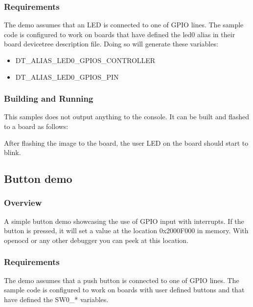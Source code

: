 \documentclass[letterpaper,10pt,english]{sphinxmanual}
\begin{document}
\subsubsection{Requirements}
\label{\detokenize{samples/basic/blinky/README:requirements}}
The demo assumes that an LED is connected to one of GPIO lines. The
sample code is configured to work on boards that have defined the led0
alias in their board devicetree description file. Doing so will generate
these variables:
\begin{itemize}
\item {} 
DT\_ALIAS\_LED0\_GPIOS\_CONTROLLER

\item {} 
DT\_ALIAS\_LED0\_GPIOS\_PIN

\end{itemize}


\subsubsection{Building and Running}
\label{\detokenize{samples/basic/blinky/README:building-and-running}}
This samples does not output anything to the console.  It can be built and
flashed to a board as follows:

After flashing the image to the board, the user LED on the board should start to
blink.


\subsection{Button demo}
\label{\detokenize{samples/basic/button/README:button-demo}}\label{\detokenize{samples/basic/button/README:button-sample}}\label{\detokenize{samples/basic/button/README::doc}}

\subsubsection{Overview}
\label{\detokenize{samples/basic/button/README:overview}}
A simple button demo showcasing the use of GPIO input with interrupts.
If the button is pressed, it will set a value at the location 0x2000F000 in memory.
With openocd or any other debugger you can peek at this location.


\subsubsection{Requirements}
\label{\detokenize{samples/basic/button/README:requirements}}
The demo assumes that a push button is connected to one of GPIO lines. The
sample code is configured to work on boards with user defined buttons and that
have defined the SW0\_* variables.
\end{document}
